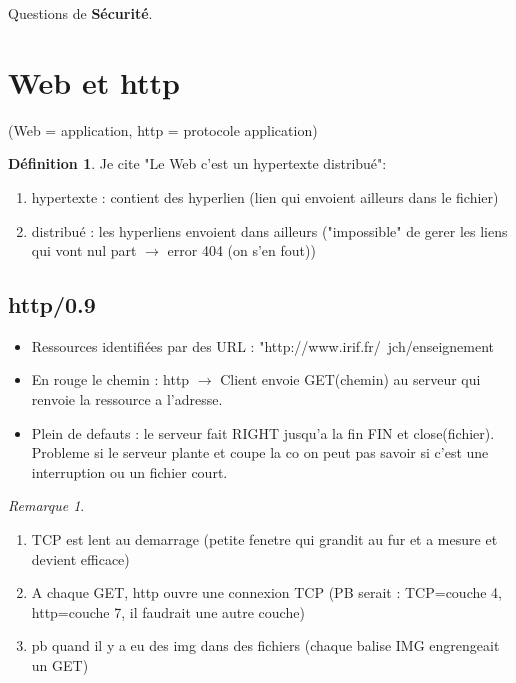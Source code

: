 \documentclass[12pt]{article}
\theoremstyle{plain}
\theoremstyle{definition}
\newtheorem{defn}[subsubsection]{D\'efinition}
\theoremstyle{remark}
\newtheorem{rem}{Remarque}
\begin{document}
Questions de \textbf{Sécurité}.

\section{Web et http}
(Web = application, http = protocole application)

\begin{defn}
    Je cite "Le Web c'est un hypertexte distribué":
    \begin{enumerate}
        \item hypertexte : contient des hyperlien (lien qui envoient ailleurs dans le fichier)
        \item distribué : les hyperliens envoient dans ailleurs ("impossible" de gerer les liens qui vont nul part $\rightarrow$ error 404 (on s'en fout))
    \end{enumerate}
\end{defn}

\subsection{http/0.9}
\begin{itemize}
    \item Ressources identifiées par des URL : "{\color{blue}http}:{\color{Green}//www.irif.fr/}{\color{red}~jch/enseignement}
    \item En rouge le chemin : http $\rightarrow$ Client envoie GET(chemin) au serveur qui renvoie la ressource a l'adresse.
    \item Plein de defauts : le serveur fait RIGHT jusqu'a la fin FIN et close(fichier). Probleme si le serveur plante et coupe la co 
    on peut pas savoir si c'est une interruption ou un fichier court.
\end{itemize}

\begin{rem}
    \begin{enumerate}
        \item TCP est lent au demarrage (petite fenetre qui grandit au fur et a mesure et devient efficace)
        \item A chaque GET, http ouvre une connexion TCP (PB serait : TCP=couche 4, http=couche 7, il faudrait une autre couche)
        \item pb quand il y a eu des img dans des fichiers (chaque balise IMG engrengeait un GET)
    \end{enumerate}
\end{rem}
\end{document}
